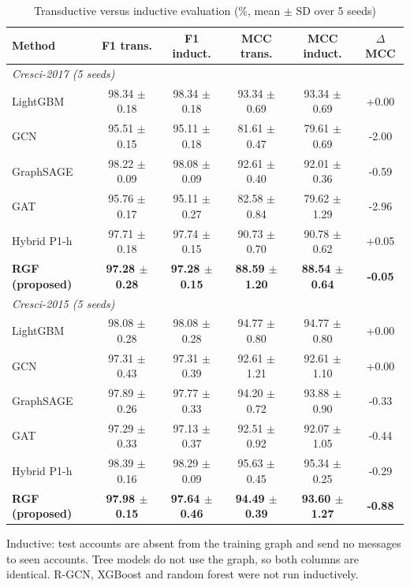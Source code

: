 \begin{table}[!t]
\centering
\caption{Transductive versus inductive evaluation (\%, mean $\pm$ SD over 5 seeds)}
\label{tab:inductive}
\footnotesize
\setlength{\tabcolsep}{3pt}
\begin{tabular}{lccccc}
\hline
\textbf{Method} & \textbf{F1 trans.} & \textbf{F1 induct.} & \textbf{MCC trans.} & \textbf{MCC induct.} & \textbf{$\Delta$MCC} \\
\hline
\multicolumn{6}{l}{\textit{Cresci-2017 (5 seeds)}} \\
LightGBM & 98.34 $\pm$ 0.18 & 98.34 $\pm$ 0.18 & 93.34 $\pm$ 0.69 & 93.34 $\pm$ 0.69 & +0.00 \\
GCN & 95.51 $\pm$ 0.15 & 95.11 $\pm$ 0.18 & 81.61 $\pm$ 0.47 & 79.61 $\pm$ 0.69 & -2.00 \\
GraphSAGE & 98.22 $\pm$ 0.09 & 98.08 $\pm$ 0.09 & 92.61 $\pm$ 0.40 & 92.01 $\pm$ 0.36 & -0.59 \\
GAT & 95.76 $\pm$ 0.17 & 95.11 $\pm$ 0.27 & 82.58 $\pm$ 0.84 & 79.62 $\pm$ 1.29 & -2.96 \\
Hybrid P1-h & 97.71 $\pm$ 0.18 & 97.74 $\pm$ 0.15 & 90.73 $\pm$ 0.70 & 90.78 $\pm$ 0.62 & +0.05 \\
\textbf{RGF (proposed)} & \textbf{97.28 $\pm$ 0.28} & \textbf{97.28 $\pm$ 0.15} & \textbf{88.59 $\pm$ 1.20} & \textbf{88.54 $\pm$ 0.64} & \textbf{-0.05} \\
\multicolumn{6}{l}{\textit{Cresci-2015 (5 seeds)}} \\
LightGBM & 98.08 $\pm$ 0.28 & 98.08 $\pm$ 0.28 & 94.77 $\pm$ 0.80 & 94.77 $\pm$ 0.80 & +0.00 \\
GCN & 97.31 $\pm$ 0.43 & 97.31 $\pm$ 0.39 & 92.61 $\pm$ 1.21 & 92.61 $\pm$ 1.10 & +0.00 \\
GraphSAGE & 97.89 $\pm$ 0.26 & 97.77 $\pm$ 0.33 & 94.20 $\pm$ 0.72 & 93.88 $\pm$ 0.90 & -0.33 \\
GAT & 97.29 $\pm$ 0.33 & 97.13 $\pm$ 0.37 & 92.51 $\pm$ 0.92 & 92.07 $\pm$ 1.05 & -0.44 \\
Hybrid P1-h & 98.39 $\pm$ 0.16 & 98.29 $\pm$ 0.09 & 95.63 $\pm$ 0.45 & 95.34 $\pm$ 0.25 & -0.29 \\
\textbf{RGF (proposed)} & \textbf{97.98 $\pm$ 0.15} & \textbf{97.64 $\pm$ 0.46} & \textbf{94.49 $\pm$ 0.39} & \textbf{93.60 $\pm$ 1.27} & \textbf{-0.88} \\
\hline
\end{tabular}
\par\smallskip\parbox{\linewidth}{\scriptsize Inductive: test accounts are absent from the training graph and send no messages to seen accounts. Tree models do not use the graph, so both columns are identical. R-GCN, XGBoost and random forest were not run inductively.}
\end{table}

